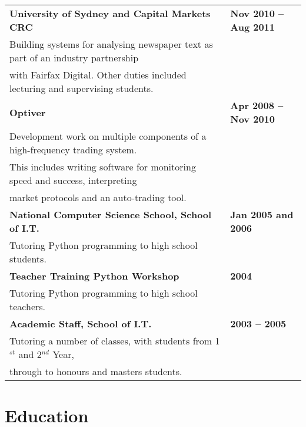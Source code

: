 \documentclass[]{article}
\begin{document}
\begin{table*}[h!]
\begin{tabular}[h!]{p{12.7cm}l}

\textbf{University of Sydney and Capital Markets CRC} & \textbf{Nov 2010 -- Aug 2011}\\
\hspace{0.5cm}Building systems for analysing newspaper text as part of an industry partnership& \\
\hspace{0.5cm}with Fairfax Digital. Other duties included lecturing and supervising students.
& \\

\textbf{Optiver} & \textbf{Apr 2008 -- Nov 2010}\\
\hspace{0.5cm}Development work on multiple components of a high-frequency trading system.&\\
\hspace{0.5cm}This includes writing software for monitoring speed and success, interpreting&\\
\hspace{0.5cm}market protocols and an auto-trading tool.
& \\

\textbf{National Computer Science School, School of I.T.} & \textbf{Jan 2005 and 2006}\\
\hspace{0.5cm}Tutoring Python programming to high school students.
& \\

\textbf{Teacher Training Python Workshop} & \textbf{2004} \\
\hspace{0.5cm}Tutoring Python programming to high school teachers. & \\

\textbf{Academic Staff, School of I.T.} & \textbf{2003 -- 2005} \\
\hspace{0.5cm}Tutoring a number of classes, with students from 1$^{st}$ and 2$^{nd}$ Year, & \\
\hspace{0.5cm}through to honours and masters students. & \\

\end{tabular}
\end{table*}

\section*{Education}
\end{document}
